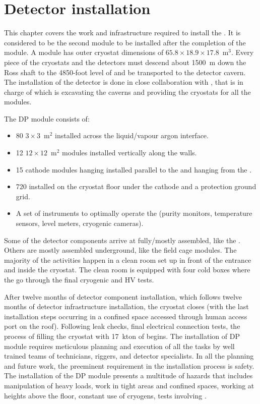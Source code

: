 \chapter{Detector installation}
\label{ch:dp-installation}
This chapter covers the work and infrastructure required to install the   .
It is considered to be the second module to be installed after the completion of the  module.
A   module has outer cryostat dimensions of $65.8 \times 18.9 \times 17.8$~m$^3$.
Every piece of the cryostats and the detectors must descend about 1500~m down the Ross shaft to the 4850-foot level of \surf and be transported to the detector cavern.
The installation of the detector is done in close collaboration with , that is in charge of which is excavating the caverns and providing the cryostats for all the  modules.

The DP module consists of:
\begin{itemize}
\item 80 $3 \times 3$~m$^2$  installed across the liquid/vapour argon interface.
\item  12 $12 \times 12$~m$^2$  modules installed vertically along the walls.
\item  15 cathode modules hanging installed parallel to the  and hanging from the .
\item  720  installed on the cryostat floor under the cathode and a protection ground grid.
\item  A set of instruments to optimally operate the  (purity monitors, temperature sensors, level meters, cryogenic cameras).
\end{itemize}

Some of the detector components arrive at \surf fully/mostly assembled, like the .
Others are mostly assembled underground, like the field cage modules.
The majority of the activities happen in a clean room set up in front of the  entrance and inside the cryostat.
The clean room is equipped with four cold boxes where the  go through the final cryogenic and HV tests.

After twelve months of detector component installation, which follows twelve months of detector infrastructure installation, the cryostat closes (with the last installation steps occurring in a confined space accessed through human access port on the roof).
Following leak checks, final electrical connection tests, the process of filling the cryostat with 17~kton of  begins.
The installation of DP module requires meticulous planning and execution of all the tasks by well trained teams of technicians, riggers, and detector specialists.
In all the planning and future work, the preeminent requirement in the installation process is safety.
The installation of the DP module presents a multitude of hazards that includes manipulation of heavy loads, work in tight areas and confined spaces, working at heights above the floor, constant use of cryogens, tests involving .

